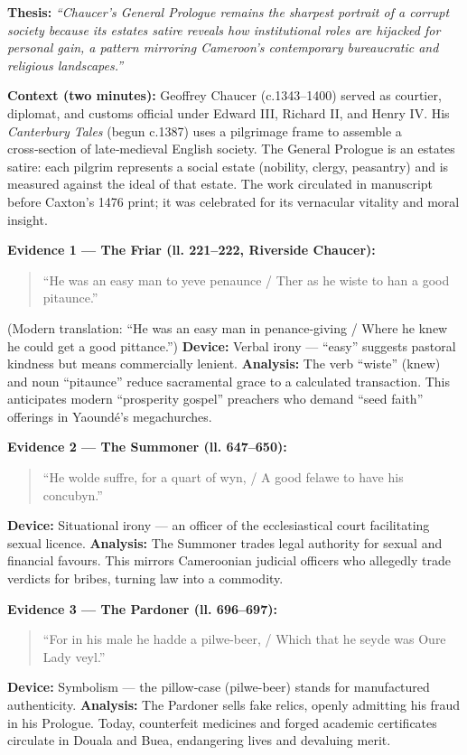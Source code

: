 \documentclass[11pt]{article}
\newcommand{\cle}[1]{{\popxbold\color{popdark}#1}}
\newcounter{popsec}
\newcounter{popsub}
\newcommand{\courssub}[1]{%
  \stepcounter{popsub}%
  \par\vspace{9pt}\noindent{\popxbold\fontsize{11.5}{13}\selectfont\color{popink}{\color{poporange}\thepopsec.\thepopsub}\hspace{6pt}#1}\par\nopagebreak\vspace{4pt}
}
\begin{document}
\courssub{Model Answers — Panel Presentations}

\begin{exemplebox}
\textbf{Thesis:} \emph{“Chaucer’s General Prologue remains the sharpest portrait of a corrupt society because its estates satire reveals how institutional roles are hijacked for personal gain, a pattern mirroring Cameroon’s contemporary bureaucratic and religious landscapes.”}

\textbf{Context (two minutes):} Geoffrey Chaucer (c.1343–1400) served as courtier, diplomat, and customs official under Edward III, Richard II, and Henry IV. His \emph{Canterbury Tales} (begun c.1387) uses a pilgrimage frame to assemble a cross‑section of late‑medieval English society. The General Prologue is an \cle{estates satire}: each pilgrim represents a social estate (nobility, clergy, peasantry) and is measured against the ideal of that estate. The work circulated in manuscript before Caxton’s 1476 print; it was celebrated for its vernacular vitality and moral insight.

\textbf{Evidence 1 — The Friar (ll. 221–222, Riverside Chaucer):} 
\begin{quote}
“He was an easy man to yeve penaunce / Ther as he wiste to han a good pitaunce.”
\end{quote}
(Modern translation: “He was an easy man in penance‑giving / Where he knew he could get a good pittance.”)
\textbf{Device:} Verbal irony — “easy” suggests pastoral kindness but means commercially lenient. 
\textbf{Analysis:} The verb “wiste” (knew) and noun “pitaunce” reduce sacramental grace to a calculated transaction. This anticipates modern “prosperity gospel” preachers who demand “seed faith” offerings in Yaoundé’s megachurches.

\textbf{Evidence 2 — The Summoner (ll. 647–650):} 
\begin{quote}
“He wolde suffre, for a quart of wyn, / A good felawe to have his concubyn.”
\end{quote}
\textbf{Device:} Situational irony — an officer of the ecclesiastical court facilitating sexual licence. 
\textbf{Analysis:} The Summoner trades legal authority for sexual and financial favours. This mirrors Cameroonian judicial officers who allegedly trade verdicts for bribes, turning law into a commodity.

\textbf{Evidence 3 — The Pardoner (ll. 696–697):} 
\begin{quote}
“For in his male he hadde a pilwe-beer, / Which that he seyde was Oure Lady veyl.”
\end{quote}
\textbf{Device:} Symbolism — the pillow‑case (pilwe-beer) stands for manufactured authenticity. 
\textbf{Analysis:} The Pardoner sells fake relics, openly admitting his fraud in his Prologue. Today, counterfeit medicines and forged academic certificates circulate in Douala and Buea, endangering lives and devaluing merit.


\end{exemplebox}
\end{document}
